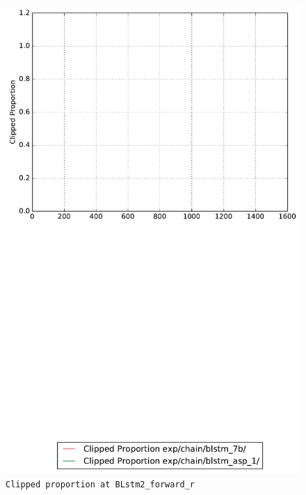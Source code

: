 \documentclass[prl,10pt,twocolumn]{revtex4}
\begin{document}
\newpage
\begin{figure}[h]
  \begin{center}
    \caption{\texttt{Clipped proportion at BLstm2\_forward\_r}}
    \includegraphics[width=\textwidth]{exp/chain/blstm_7b/report/clipped_proportion_BLstm2_forward_r.pdf}
  \end{center}
\end{figure}
\clearpage
\end{document}
